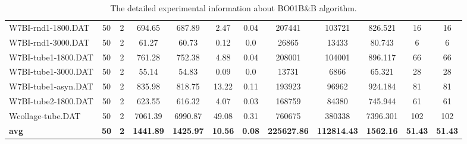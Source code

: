 \begin{table}[!h]
{\begin{tabular}{lccccccccccc}
W7BI-rnd1-1800.DAT & 50 & 2 & 694.65 & 687.89 & 2.47 & 0.04 & 207441 & 103721 & 826.521 & 16 & 16\\
W7BI-rnd1-3000.DAT & 50 & 2 & 61.27 & 60.73 & 0.12 & 0.0 & 26865 & 13433 & 80.743 & 6 & 6\\
W7BI-tube1-1800.DAT & 50 & 2 & 761.28 & 752.38 & 4.88 & 0.04 & 208001 & 104001 & 896.117 & 66 & 66\\
W7BI-tube1-3000.DAT & 50 & 2 & 55.14 & 54.83 & 0.09 & 0.0 & 13731 & 6866 & 65.321 & 28 & 28\\
W7BI-tube1-asyn.DAT & 50 & 2 & 835.98 & 818.75 & 13.22 & 0.11 & 193923 & 96962 & 924.184 & 81 & 81\\
W7BI-tube2-1800.DAT & 50 & 2 & 623.55 & 616.32 & 4.07 & 0.03 & 168759 & 84380 & 745.944 & 61 & 61\\
Wcollage-tube.DAT & 50 & 2 & 7061.39 & 6990.87 & 49.08 & 0.31 & 760675 & 380338 & 7396.301 & 102 & 102\\
\cline{1-12} \textbf{avg} & \textbf{50} & \textbf{2} & \textbf{1441.89} & \textbf{1425.97} & \textbf{10.56} & \textbf{0.08} & \textbf{225627.86} & \textbf{112814.43} & \textbf{1562.16} & \textbf{51.43} & \textbf{51.43} \\ \cline{1-12}
\bottomrule
\end{tabular}%
}%
\caption{The detailed experimental information about BO01B\&B algorithm.}
\label{tab:table_bb}
\end{table}

